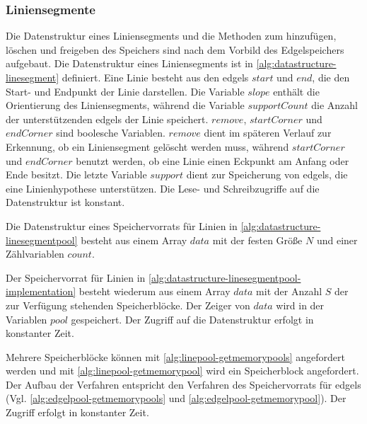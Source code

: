 \subsubsection{Liniensegmente} %
\label{sub:datenstruktur-liniensegmente}

Die Datenstruktur eines Liniensegments und die Methoden zum hinzufügen, löschen und freigeben des Speichers sind nach
 dem Vorbild des Edgelspeichers aufgebaut. Die Datenstruktur eines Liniensegments ist in
 \autoref{alg:datastructure-linesegment} definiert. Eine Linie besteht aus den \glspl{edgel} $\mathit{start}$ und
 $\mathit{end}$, die den Start- und Endpunkt der Linie darstellen. Die Variable $\mathit{slope}$ enthält die
 Orientierung des Liniensegments, während die Variable $\mathit{supportCount}$ die Anzahl der unterstützenden
 \glspl{edgel} der Linie speichert. $\mathit{remove}$, $\mathit{startCorner}$ und $\mathit{endCorner}$ sind boolesche
 Variablen. $\mathit{remove}$ dient im späteren Verlauf zur Erkennung, ob ein Liniensegment gelöscht werden muss,
 während $\mathit{startCorner}$ und $\mathit{endCorner}$ benutzt werden, ob eine Linie einen Eckpunkt am Anfang oder
 Ende besitzt. Die letzte Variable $\mathit{support}$ dient zur Speicherung von \glspl{edgel}, die eine Linienhypothese
 unterstützen. Die Lese- und Schreibzugriffe auf die Datenstruktur ist konstant.



Die Datenstruktur eines Speichervorrats für Linien in \autoref{alg:datastructure-linesegmentpool} besteht aus einem
 Array $\mathit{data}$ mit der festen Größe $N$ und einer Zählvariablen $\mathit{count}$.



Der Speichervorrat für Linien in \autoref{alg:datastructure-linesegmentpool-implementation} besteht wiederum aus einem
 Array $\mathit{data}$ mit der Anzahl $S$ der zur Verfügung stehenden Speicherblöcke. Der Zeiger von $\mathit{data}$
 wird in der Variablen $\mathit{pool}$ gespeichert. Der Zugriff auf die Datenstruktur erfolgt in konstanter Zeit.

Mehrere Speicherblöcke können mit \autoref{alg:linepool-getmemorypools} angefordert werden und mit
 \autoref{alg:linepool-getmemorypool} wird ein Speicherblock angefordert. Der Aufbau der Verfahren entspricht den
 Verfahren des Speichervorrats für \glspl{edgel} (Vgl. \autoref{alg:edgelpool-getmemorypools} und
 \autoref{alg:edgelpool-getmemorypool}). Der Zugriff erfolgt in konstanter Zeit.

